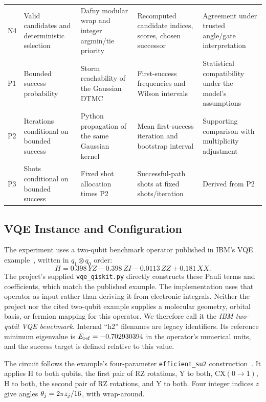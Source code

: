 \documentclass[conference]{IEEEtran}
\begin{document}
\begin{table}[!t]
\begin{tabularx}{\textwidth}{@{}p{}>{\raggedright\arraybackslash}p{}>{\raggedright\arraybackslash}p{}>{\raggedright\arraybackslash}p{}Y@{}}
N4 & Valid candidates and deterministic selection & Dafny modular wrap and integer argmin/tie priority & Recomputed candidate indices, scores, chosen successor & Agreement under trusted angle/gate interpretation \\
P1 & Bounded success probability & Storm reachability of the Gaussian DTMC & First-success frequencies and Wilson intervals & Statistical compatibility under the model's assumptions \\
P2 & Iterations conditional on bounded success & Python propagation of the same Gaussian kernel & Mean first-success iteration and bootstrap interval & Supporting comparison with multiplicity adjustment \\
P3 & Shots conditional on bounded success & Fixed shot allocation times P2 & Successful-path shots at fixed shots/iteration & Derived from P2 \\
\bottomrule
\end{tabularx}
\end{table}

\subsection{VQE Instance and Configuration}
\label{sec:instance}
The experiment uses a two-qubit benchmark operator published in IBM's VQE example~\cite{ibmvqe}, written in $q_1\otimes q_0$ order:
\begin{equation}
 H=0.398\,YZ-0.398\,ZI-0.0113\,ZZ+0.181\,XX.
 \label{eq:hamiltonian}
\end{equation}
The project's supplied \texttt{vqe\_qiskit.py} directly constructs these Pauli terms and coefficients, which match the published example. The implementation uses that operator as input rather than deriving it from electronic integrals. Neither the project nor the cited two-qubit example supplies a molecular geometry, orbital basis, or fermion mapping for this operator. We therefore call it the \emph{IBM two-qubit VQE benchmark}. Internal ``h2'' filenames are legacy identifiers. Its reference minimum eigenvalue is $E_{\rm ref}=-0.702930394$ in the operator's numerical units, and the success target is defined relative to this value.

The circuit follows the example's four-parameter \texttt{efficient\_su2} construction~\cite{ibmvqe}. It applies H to both qubits, the first pair of RZ rotations, Y to both, CX$(0\!\to\!1)$, H to both, the second pair of RZ rotations, and Y to both. Four integer indices $z$ give angles $\theta_j=2\pi z_j/16$, with wrap-around.
\end{document}
